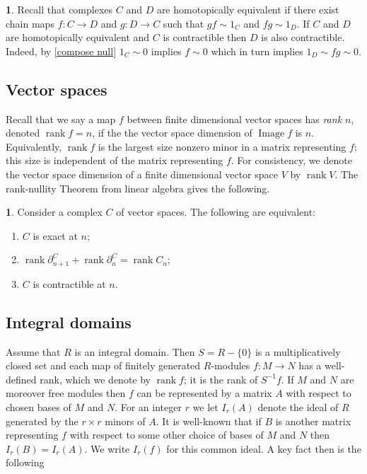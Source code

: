 \documentclass{amsart}[11pt]
\newcommand{\Image}{\operatorname{Image}}
\newcommand{\rank}{\operatorname{rank}}
\numberwithin{equation}{section}
\theoremstyle{plain}
\newtheorem*{Main Theorem}{Main Theorem}
\theoremstyle{definition}
\newtheorem{chunk}[theorem]{}
\theoremstyle{remark}
\numberwithin{equation}{theorem}
\begin{document}
\begin{chunk}\label{contract equiv} Recall that complexes $C$ and $D$ are homotopically equivalent if there exist chain maps
$f:C\to D$ and $g:D\to C$ such that $gf\sim 1_C$ and $fg\sim 1_D$. If $C$ and $D$ are homotopically equivalent and $C$ is contractible then $D$ is also contractible.  Indeed, by \ref{compose null} 
$1_C\sim 0$ implies $f\sim 0$ which in turn implies $1_D\sim fg\sim 0$.
\end{chunk}

\subsection*{Vector spaces}

Recall that we say a map $f$ between finite dimensional vector spaces has \emph{rank $n$}, denoted 
$\rank f=n$, if the the vector space dimension of $\Image f$ is $n$.  Equivalently, $\rank f$ is the largest size nonzero minor in a matrix representing $f$; this size is independent of the matrix representing $f$. For consistency, we denote the vector space dimension of a finite dimensional vector space $V$ by $\rank V$.
The rank-nullity Theorem from linear algebra gives the following.

\begin{chunk}\label{rank=} Consider a complex $C$ of vector spaces. The following are equivalent: 
\begin{enumerate}
\item $C$ is exact at $n$;
\item $\rank\partial^C_{n+1}+\rank\partial^C_n=\rank C_n$;
\item $C$ is contractible at $n$.
\end{enumerate}
\end{chunk}

\subsection*{Integral domains}
Assume that $R$ is an integral domain.  Then $S=R-\{0\}$ is a multiplicatively closed set and each map of finitely generated $R$-modules $f:M\to N$ has a well-defined rank, which we denote by 
$\rank f$; it is the rank of $S^{-1}f$. If $M$ and $N$ are moreover free modules then $f$ can be represented by a matrix $A$ with respect to chosen bases of 
$M$ and $N$. For an integer $r$ we let $I_r(A)$ denote the ideal of $R$ generated by the 
$r\times r$ minors of $A$.  It is well-known that if $B$ is another matrix representing
$f$ with respect to some other choice of bases of $M$ and $N$ then 
$I_r(B)=I_r(A)$.  We write $I_r(f)$ for this common ideal. A key fact then is the following
\end{document}
